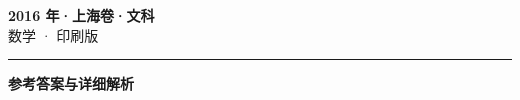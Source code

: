 \documentclass[zihao=5, a4paper]{ctexart}
\begin{document}
\begin{center}
  {\Large\bfseries 2016 年·上海卷·文科}\\[4pt]
  {\large 数学 · 印刷版}
\end{center}
\medskip
{}

\par\bigskip\hrule\bigskip
{}
\begin{center}{\large\bfseries 参考答案与详细解析}\end{center}
\smallskip

\end{document}
